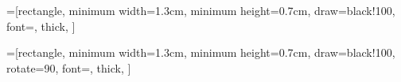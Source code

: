 
=[rectangle,
                     minimum width=1.3cm,
                     minimum height=0.7cm,
                     draw=black!100,
                     font=\small,
                     thick,
                    ]

=[rectangle,
                     minimum width=1.3cm,
                     minimum height=0.7cm,
                     draw=black!100,
                     rotate=90,
                     font=\small,
                     thick,
                    ]

